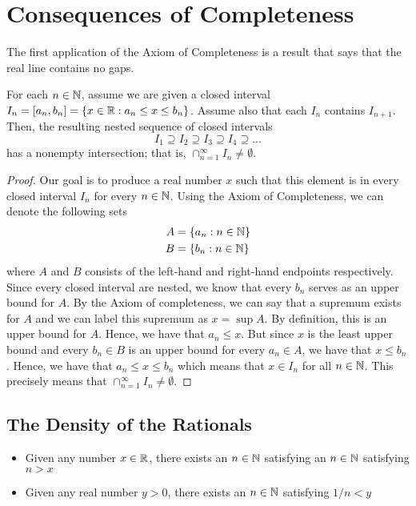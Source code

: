 
\section{Consequences of Completeness}

The first application of the Axiom of Completeness is a result that says that the real line contains no gaps. 

\begin{theorem}
        For each \( n \in \mathbb{N} \), assume we are given a closed interval \( I_n = [a_n, b_n ] = \{ x \in \mathbb{R} : a_n \leq x \leq b_n \} \). Assume also that each \( I_n \) contains \( I_{n+1}\). Then, the resulting nested sequence of closed intervals 
        \[ I_1 \supseteq I_2 \supseteq I_3 \supseteq I_4 \supseteq ... \]
        has a nonempty intersection; that is, \( \cap_{n=1}^{\infty} I_n \neq \emptyset \).
    \end{theorem}

\begin{proof}
    Our goal is to produce a real number \( x \) such that this element is in every closed interval \( I_n \) for every \( n \in \mathbb{N} \). Using the Axiom of Completeness, we can denote the following sets 
    \begin{align*} A &= \{  a_n : n \in \mathbb{N}  \} \\ 
                   B &= \{  b_n : n \in \mathbb{N}  \}
     \end{align*} 
    where \( A \) and \( B \) consists of the left-hand and right-hand endpoints respectively. Since every closed interval are nested, we know that every \( b_n \) serves as an upper bound for \( A \). By the Axiom of completeness, we can say that a supremum exists for \( A \) and we can label this supremum as \( x = \sup A \). By definition, this is an upper bound for \( A \). Hence, we have that \( a_n \leq x \). But since \( x \) is the least upper bound and every \( b_n \in B \) is an upper bound for every \( a_n \in A \), we have that \( x \leq b_n \). Hence, we have that \( a_n \leq x \leq b_n \) which means that \( x \in I_n \) for all \( n \in \mathbb{N} \). This precisely means that \( \cap_{n=1}^{\infty} I_n \neq \emptyset \).
\end{proof}

\subsection{The Density of the Rationals }

\begin{theorem}
    \begin{itemize}
        
        \item Given any number \( x \in \mathbb{R} \), there exists an \( n \in \mathbb{N} \) satisfying an \( n \in \mathbb{N} \) satisfying \( n > x \)
        \item Given any real number \( y > 0 \), there exists an \( n \in \mathbb{N} \) satisfying \( 1/n < y \)

    \end{itemize}
    
\end{theorem}

